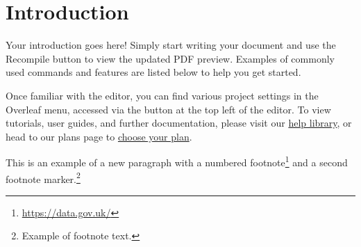 \section{Introduction}

Your introduction goes here! Simply start writing your document and use the Recompile button to view the updated PDF preview. Examples of commonly used commands and features are listed below to help you get started.
\lipsum[2]

Once familiar with the editor, you can find various project settings in the Overleaf menu, accessed via the button at the top left of the editor. To view tutorials, user guides, and further documentation, please visit our \href{https://www.overleaf.com/learn}{help library}, or head to our plans page to \href{https://www.overleaf.com/user/subscription/plans}{choose your plan}. 

This is an example of a new paragraph with a numbered footnote\footnote{\url{https://data.gov.uk/}} and a second footnote marker.\footnote{Example of footnote text.}


